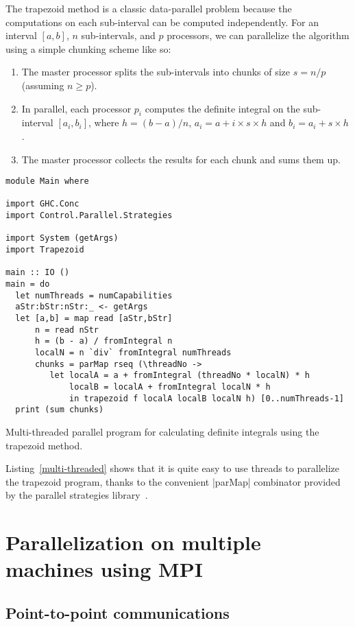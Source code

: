 \documentclass{tmr}
\begin{document}
The trapezoid method is a classic data-parallel problem because
the computations on each sub-interval can be computed independently.
For an interval $[a,b]$, $n$ sub-intervals, and $p$ processors, we can parallelize
the algorithm using a simple chunking scheme like so:
\begin{enumerate}
   \item The master processor splits the sub-intervals into chunks of size $s = n/p$ (assuming $n \ge p$).
   \item In parallel, each processor $p_i$ computes the definite integral on the sub-interval 
         $[a_i, b_i]$, where $h = (b - a)/n$, $a_i = a + i \times s \times h$ and
         $b_i = a_i + s \times h$.
   \item The master processor collects the results for each chunk and sums them up.
\end{enumerate}

\begin{listing}
\begin{Verbatim}
module Main where

import GHC.Conc
import Control.Parallel.Strategies

import System (getArgs)
import Trapezoid

main :: IO ()
main = do
  let numThreads = numCapabilities
  aStr:bStr:nStr:_ <- getArgs
  let [a,b] = map read [aStr,bStr]
      n = read nStr
      h = (b - a) / fromIntegral n
      localN = n `div` fromIntegral numThreads
      chunks = parMap rseq (\threadNo ->
         let localA = a + fromIntegral (threadNo * localN) * h
             localB = localA + fromIntegral localN * h
             in trapezoid f localA localB localN h) [0..numThreads-1]
  print (sum chunks)
\end{Verbatim}
\caption{Multi-threaded parallel program for calculating definite integrals using the trapezoid method. \label{multi-threaded}}
\end{listing}

Listing~\ref{multi-threaded} shows that it is quite easy to use threads to
parallelize the trapezoid program, thanks to the convenient |parMap| combinator provided by the
parallel strategies library~\cite{parallel_library}.

\section{Parallelization on multiple machines using MPI}

\subsection{Point-to-point communications}
\end{document}
